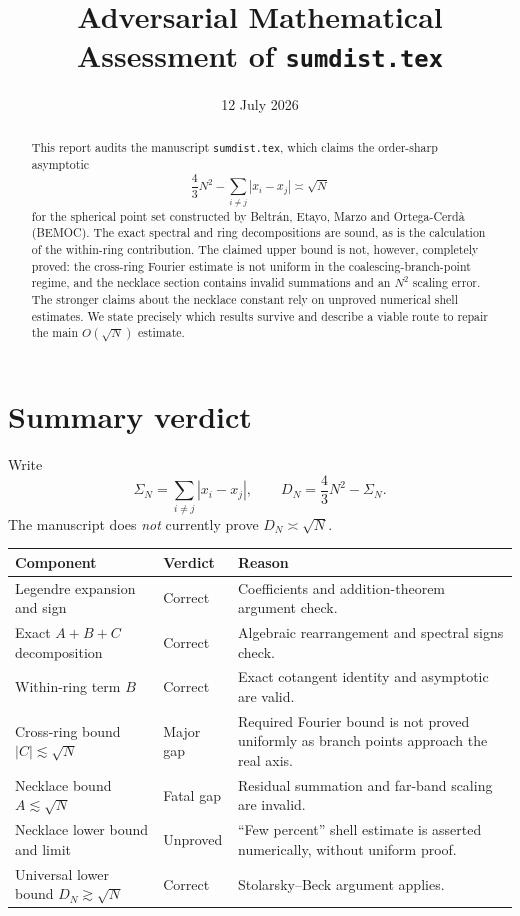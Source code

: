 \documentclass[11pt]{article}
\title{Adversarial Mathematical Assessment of \texttt{sumdist.tex}}
\author{}
\date{12 July 2026}
\begin{document}
\maketitle

\begin{abstract}
This report audits the manuscript \texttt{sumdist.tex}, which claims the
order-sharp asymptotic
\[
 \frac43N^2-\sum_{i\ne j}|x_i-x_j|\asymp\sqrt N
\]
for the spherical point set constructed by Beltr\'an, Etayo, Marzo and
Ortega-Cerd\`a (BEMOC).  The exact spectral and ring decompositions are sound,
as is the calculation of the within-ring contribution.  The claimed upper
bound is not, however, completely proved: the cross-ring Fourier estimate is
not uniform in the coalescing-branch-point regime, and the necklace section
contains invalid summations and an $N^2$ scaling error.  The stronger claims
about the necklace constant rely on unproved numerical shell estimates.  We
state precisely which results survive and describe a viable route to repair
the main $O(\sqrt N)$ estimate.
\end{abstract}

\section{Summary verdict}

Write
\[
 \Sigma_N=\sum_{i\ne j}|x_i-x_j|,
 \qquad D_N=\frac43N^2-\Sigma_N.
\]
The manuscript does \emph{not} currently prove $D_N\asymp\sqrt N$.

\begin{center}
\begin{tabular}{p{}p{}p{}}
\toprule
Component & Verdict & Reason\\
\midrule
Legendre expansion and sign & Correct & Coefficients and addition-theorem argument check.\\
Exact $A+B+C$ decomposition & Correct & Algebraic rearrangement and spectral signs check.\\
Within-ring term $B$ & Correct & Exact cotangent identity and asymptotic are valid.\\
Cross-ring bound $|C|\lesssim\sqrt N$ & Major gap & Required Fourier bound is not proved uniformly as branch points approach the real axis.\\
Necklace bound $A\lesssim\sqrt N$ & Fatal gap & Residual summation and far-band scaling are invalid.\\
Necklace lower bound and limit & Unproved & ``Few percent'' shell estimate is asserted numerically, without uniform proof.\\
Universal lower bound $D_N\gtrsim\sqrt N$ & Correct & Stolarsky--Beck argument applies.\\
\bottomrule
\end{tabular}
\end{center}
\end{document}
